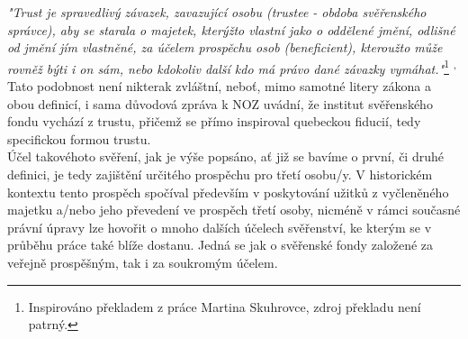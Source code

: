 \documentclass{article}
\begin{document}

\textit{"Trust je spravedlivý závazek, zavazující osobu (trustee - obdoba svěřenského správce), aby se starala o majetek, kterýžto vlastní jako o oddělené jmění, odlišné od jmění jím vlastněné, za účelem prospěchu osob (beneficient), kteroužto může rovněž býti i on sám, nebo kdokoliv další kdo má právo dané závazky vymáhat."}\footnote{Inspirováno překladem z práce Martina Skuhrovce, zdroj překladu není patrný.} \textsuperscript{,}   \\

Tato podobnost není nikterak zvláštní, neboť, mimo samotné litery zákona a obou definicí, i sama důvodová zpráva k NOZ uvádní, že institut svěřenského fondu vychází z trustu, přičemž se přímo inspiroval quebeckou fiducií, tedy specifickou formou trustu.\\


Účel takovéhoto svěření, jak je výše popsáno, ať již se bavíme o první, či druhé definici, je tedy zajištění určitého prospěchu pro třetí osobu/y. V historickém kontextu tento prospěch spočíval především v poskytování užitků z vyčleněného majetku a/nebo jeho převedení ve prospěch třetí osoby, nicméně v rámci současné právní úpravy lze hovořit o mnoho dalších účelech svěřenství, ke kterým se v průběhu práce také blíže dostanu. Jedná se jak o svěřenské fondy založené za veřejně prospěšným, tak i za soukromým účelem.\\
\end{document}
